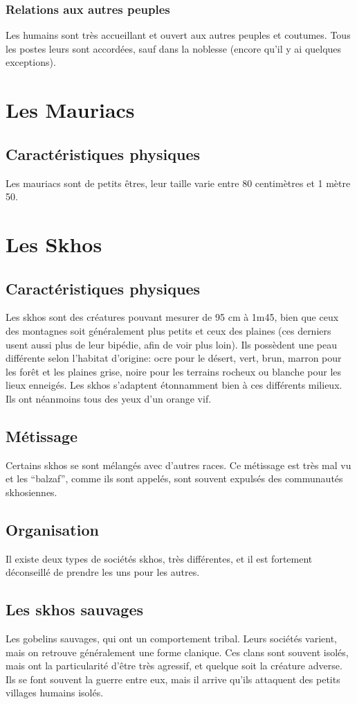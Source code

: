 \subsubsection{Relations aux autres peuples}
Les humains sont très accueillant et ouvert aux autres peuples et coutumes. Tous les postes leurs sont accordées, sauf dans la noblesse (encore qu’il y ai quelques exceptions). 

\section{Les Mauriacs}
\subsection{Caractéristiques physiques}
Les mauriacs sont de petits êtres, leur taille varie entre 80 centimètres et 1 mètre 50.

\section{Les Skhos}
\subsection{Caractéristiques physiques}
Les skhos sont des créatures pouvant mesurer de 95 cm à 1m45, bien que ceux des montagnes soit généralement plus petits et ceux des plaines (ces derniers usent aussi plus de leur bipédie, afin de voir plus loin). Ils possèdent une peau différente selon l’habitat d’origine: ocre pour le désert, vert, brun, marron pour les forêt et les plaines grise, noire pour les terrains rocheux ou blanche pour les lieux enneigés. Les skhos s'adaptent étonnamment bien à ces différents milieux. Ils ont néanmoins tous des yeux d'un orange vif.
\subsection{Métissage}
Certains skhos se sont mélangés avec d'autres races. Ce métissage est très mal vu et les “balzaf”, comme ils sont appelés, sont souvent expulsés des communautés skhosiennes.
\subsection{Organisation}
Il existe deux types de sociétés skhos, très différentes, et il est fortement déconseillé de prendre les uns pour les autres.
\subsection{Les skhos sauvages}
Les gobelins sauvages, qui ont un comportement tribal. Leurs sociétés varient, mais on retrouve généralement une forme clanique. Ces clans sont souvent isolés, mais ont la particularité d'être très agressif, et quelque soit la créature adverse. Ils se font souvent la guerre entre eux, mais il arrive qu'ils attaquent des petits villages humains isolés.
